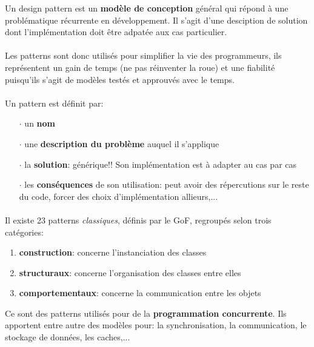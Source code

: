 \item{}
{Un design pattern est un \textbf{modèle de conception} général qui répond à une problématique récurrente en développement. Il s'agit d'une desciption de solution dont l'implémentation doit être adpatée aux cas particulier.
\paragraph{}
Les patterns sont donc utilisés pour simplifier la vie des programmeurs, ils représentent un gain de temps (ne pas réinventer la roue) et une fiabilité puisqu'ils s'agit de modèles testés et approuvés avec le temps.

\paragraph{}
Un pattern est définit par:
\begin{itemize}
\item[$\cdot$]un \textbf{nom}
\item[$\cdot$]une \textbf{description du problème} auquel il s'applique
\item[$\cdot$]la \textbf{solution}: générique!! Son implémentation est à adapter au cas par cas
\item[$\cdot$]les \textbf{conséquences} de son utilisation: peut avoir des répercutions sur le reste du code, forcer des choix d'implémentation allieurs,...
\end{itemize}

\paragraph{}
Il existe 23 patterns \textit{classiques}, définis par le GoF, regroupés selon trois catégories:
\begin{enumerate}
\item \textbf{construction}: concerne l'instanciation des classes
\item \textbf{structuraux}: concerne l'organisation des classes entre elles
\item \textbf{comportementaux}: concerne la communication entre les objets
\end{enumerate}
}

\item{}
{Ce sont des patterns utilisés pour de la \textbf{programmation concurrente}.
Ils apportent entre autre des modèles pour: la synchronisation, la communication, le stockage de données, les caches,...
}

